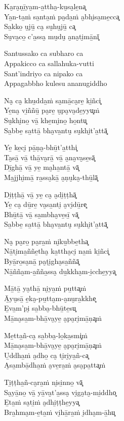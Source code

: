 \begin{paritta}
Ka̮ra̮ṇī̱ya̮m-a̱ttha̮-ku̮sa̮le̱na͓\\
Ya̱n-ta̱ṁ sa̱nta̱ṁ pa̮da̱ṁ a̮bhi̮sa̮me̱cca͓\\
Sa̱kko̱ u̮jū̱ ca̮ su̮hu̮jū̱ ca͓\\
Su̮va̮co̱ c'a̱ssa̮ mu̮du̮ a̮na̮ti̮mā̱nī͓

Santussako ca subharo ca\\
Appakicco ca sallahuka-vutti\\
Sant'indriyo ca nipako ca\\
Appagabbho kulesu ananugiddho

Na̮ ca̮ khu̱dda̱ṁ sa̮mā̱ca̮re̱ ki̱ñci͓\\
Ye̱na̮ vi̱ññū̱ pa̮re̱ u̮pa̮va̮de̱yyu͓ṁ\\
Su̮khi̮no̱ vā̱ khe̱mi̮no̱ ho̱ntu͓\\
Sa̱bbe̱ sa̱ttā̱ bha̮va̱ntu̮ su̮khi̮t'a̱ttā͓

Ye̱ ke̱ci̮ pā̱ṇa̮-bhū̱t'a̱tthi͓\\
Ta̮sā̱ vā̱ thā̱va̮rā̱ vā̱ a̮na̮va̮se̱sā͓\\
Dī̱ghā̱ vā̱ ye̱ ma̮ha̱ntā̱ vā͓\\
Ma̱jjhi̮mā̱ ra̱ssa̮kā̱ a̮ṇu̮ka̮-thū̱lā͓

Di̱ṭṭhā̱ vā̱ ye̱ ca̮ a̮di̱ṭṭhā͓\\
Ye̱ ca̮ dū̱re̱ va̮sa̱nti̮ a̮vi̮dū̱re͓\\
Bhū̱tā̱ vā̱ sa̱mbha̮ve̱sī̱ vā͓\\
Sa̱bbe̱ sa̱ttā̱ bha̮va̱ntu̮ su̮khi̮t'a̱ttā͓

Na̮ pa̮ro̱ pa̮ra̱ṁ ni̮ku̱bbe̱tha͓\\
Nā̱ti̮ma̱ññe̱tha̮ ka̱ttha̮ci̮ na̱ṁ ki̱ñci͓\\
Byā̱ro̱sa̮nā̱ pa̮ṭi̮gha̮sa̱ññā͓\\
Nā̱ñña̮m-a̱ñña̱ssa̮ du̱kkha̮m-i̱cche̱yya͓

Mā̱tā̱ ya̮thā̱ ni̮ya̱ṁ pu̱tta͓ṁ\\
Ā̱yu̮sā̱ e̱ka̮-pu̱tta̮m-a̮nu̮ra̱kkhe͓\\
E̱va̱m'pi̮ sa̱bba̮-bhū̱te̱su͓\\
Mā̱na̮sa̱m-bhā̱va̮ye̱ a̮pa̮ri̮mā̱ṇa͓ṁ

Me̱tta̱ñ-ca̮ sa̱bba̮-lo̱ka̱smi͓ṁ\\
Mā̱na̮sa̱m-bhā̱va̮ye̱ a̮pa̮ri̮mā̱ṇa͓ṁ\\
U̱ddha̱ṁ a̮dho̱ ca̮ ti̮ri̮ya̱ñ-ca͓\\
A̮sa̱mbā̱dha̱ṁ a̮ve̱ra̱ṁ a̮sa̮pa̱tta͓ṁ

Ti̱ṭṭha̱ñ-ca̮ra̱ṁ ni̮si̱nno̱ vā͓\\
Sa̮yā̱no̱ vā̱ yā̱va̮t'a̱ssa̮ vi̮ga̮ta̮-mi̱ddho͓\\
E̱ta̱ṁ sa̮ti̱ṁ a̮dhi̱ṭṭhe̱yya͓\\
Bra̱hma̮m-e̱ta̱ṁ vi̮hā̱ra̱ṁ i̮dha̮m-ā̱hu͓


\end{paritta}
